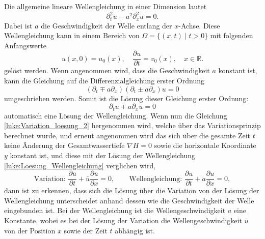 Die allgemeine lineare Wellengleichung in einer Dimension lautet
\[
\partial_t^2 u - a^2 \partial_x^2 u  = 0.
\]
Dabei ist $a$ die Geschwindigkeit der Welle entlang der $x$-Achse.
Diese Wellengleichung kann in einem Bereich von $\Omega = \{(x,t)\mid t >0\}$ mit folgenden Anfangswerte
\[
u(x,0) = u_0(x),\quad \frac{\partial u}{\partial t} = v_0(x),\quad x \in \mathbb{R}.
\]
gelöst werden.
Wenn angenommen wird, dass die Geschwindigkeit $a$ konstant ist, kann die Gleichung auf die Differenzialgleichung erster Ordnung
\[
(\partial_t\mp a\partial_x)(\partial_t\pm a\partial_x) u  = 0
\]
 umgeschrieben werden.
Somit ist die Lösung dieser Gleichung erster Ordnung:
\begin{equation}
	\partial_t u \mp a\partial_x u = 0
	\label{luke:Loesung_Wellengleichung}
\end{equation}
automatisch eine Lösung der Wellengleichung.
Wenn nun die Gleichung \eqref{luke:Variation_loesung_2} hergenommen wird, welche über das Variationsprinzip berechnet wurde, und erneut angenommen wird das sich über die gesamte Zeit $t$ keine Änderung der Gesamtwassertiefe $ \nabla H = 0 $ sowie die horizontale Koordinate $y$ konstant ist, und diese mit der Lösung der Wellengleichung \eqref{luke:Loesung_Wellengleichung} verglichen wird,
\[
\text{Variation: }\frac{\partial \bar{u}}{\partial t} + \bar{u} \frac{\partial \bar{u}}{\partial x} = 0,
\qquad
\text{Wellengleichung: }\frac{\partial u}{\partial t} + a \frac{\partial u}{\partial x} = 0,
\]
dann ist zu erkennen, dass sich die Lösung über die Variation von der Lösung der Wellengleichung unterscheidet anhand dessen wie die Geschwindigkeit der Welle eingebunden ist.
Bei der Wellengleichung ist die Wellengeschwindigkeit $a$ eine Konstante, wobei es bei der Lösung der Variation die Wellengeschwindigkeit $\bar{u}$ von der Position $x$ sowie der Zeit $t$ abhängig ist.
